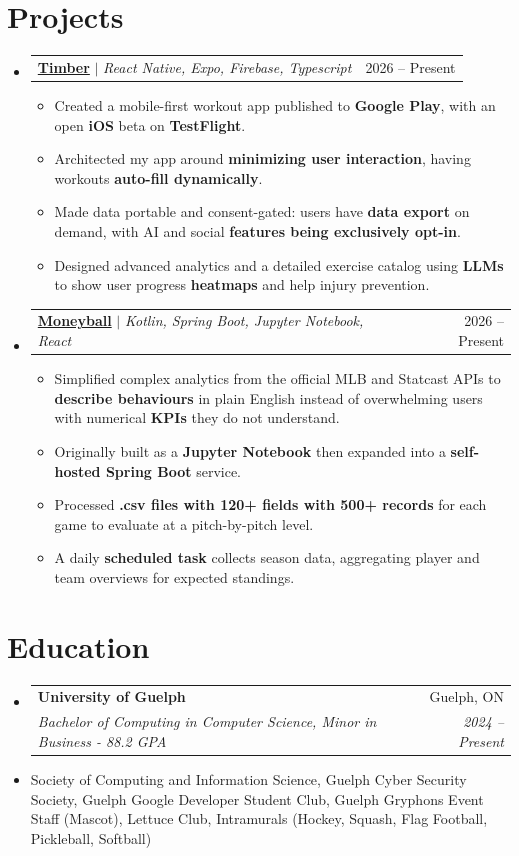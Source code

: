 \documentclass[letterpaper,11pt]{article}
\makeatletter
\newcommand{\resumeItem}[1]{
  \item\small{
    {#1 \vspace{-2pt}}
  }
}
\newcommand{\resumeSubheading}[4]{
  \vspace{-2pt}\item
    \begin{tabular*}{0.97\textwidth}[t]{l@{\extracolsep{\fill}}r}
      \textbf{#1} & #2 \\
      \textit{\small#3} & \textit{\small #4} \\
    \end{tabular*}\vspace{-7pt}
}
\newcommand{\resumeProjectHeading}[2]{
    \item
    \begin{tabular*}{0.97\textwidth}{l@{\extracolsep{\fill}}r}
      \small#1 & #2 \\
    \end{tabular*}\vspace{-7pt}
}
\newcommand{\resumeSubHeadingListStart}{\begin{itemize}[leftmargin=0.15in, label={}]}
\newcommand{\resumeSubHeadingListEnd}{\end{itemize}}
\newcommand{\resumeItemListStart}{\begin{itemize}}
\newcommand{\resumeItemListEnd}{\end{itemize}\vspace{-5pt}}
\makeatother
\begin{document}
\section{Projects}
    \resumeSubHeadingListStart
        \resumeProjectHeading
          {\textbf{\href{https://timber-app.ca}{Timber}} $|$ \emph{React Native, Expo, Firebase, Typescript}}{2026 -- Present}
          \resumeItemListStart
            \resumeItem{Created a mobile-first workout app published to \textbf{Google Play}, with an open \textbf{iOS} beta on \textbf{TestFlight}.}
            \resumeItem{Architected my app around \textbf{minimizing user interaction}, having workouts \textbf{auto-fill dynamically}.}
            \resumeItem{Made data portable and consent-gated: users have \textbf{data export} on demand, with AI and social \textbf{features being exclusively opt-in}.}
            \resumeItem{Designed advanced analytics and a detailed exercise catalog using \textbf{LLMs} to show user progress \textbf{heatmaps} and help injury prevention.}
          \resumeItemListEnd
          \resumeProjectHeading {\href{https://moneyball.adam-montgomery.ca/}{\textbf{Moneyball}} $|$ \emph{Kotlin, Spring Boot, Jupyter Notebook, React}}{2026 -- Present}
          \resumeItemListStart
            \resumeItem{Simplified complex analytics from the official MLB and Statcast APIs to \textbf{describe behaviours} in plain English instead of overwhelming users with numerical \textbf{KPIs} they do not understand.}
            \resumeItem{Originally built as a \textbf{Jupyter Notebook} then expanded into a \textbf{self-hosted Spring Boot} service.}
            \resumeItem{Processed \textbf{.csv files with 120+ fields with 500+ records} for each game to evaluate at a pitch-by-pitch level.}
            \resumeItem{A daily \textbf{scheduled task} collects season data, aggregating player and team overviews for expected standings.}
          \resumeItemListEnd
    \resumeSubHeadingListEnd

    
\section{Education}
  \resumeSubHeadingListStart
    \resumeSubheading
      {University of Guelph}{Guelph, ON}
      {Bachelor of Computing in Computer Science, Minor in Business - 88.2 GPA}{2024 -- Present}
    \resumeItem{Society of Computing and Information Science, Guelph Cyber Security Society, Guelph Google Developer Student Club, Guelph Gryphons Event Staff (Mascot), Lettuce Club, Intramurals (Hockey, Squash, Flag Football, Pickleball, Softball)}
  \resumeSubHeadingListEnd
\end{document}
